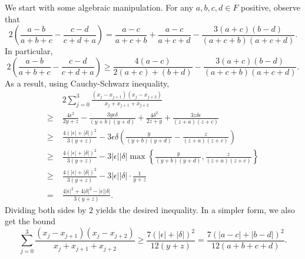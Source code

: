 \documentclass{article}
\begin{document}
We start with some algebraic manipulation.
For any $a, b, c, d \in F$ positive, observe that
\[ 2\left(\frac{a - b}{a + b + c} - \frac{c - d}{c + d + a}\right) = \frac{a - c}{a + c + b} + \frac{a - c}{a + c + d} - \frac{3(a + c)(b - d)}{(a + c + b)(a + c + d)}. \]
In particular,
\[ 2\left(\frac{a - b}{a + b + c} - \frac{c - d}{c + d + a}\right) \geq \frac{4(a - c)}{2(a + c) + (b + d)} - \frac{3(a + c)(b - d)}{(a + c + b)(a + c + d)}. \]
As a result, using Cauchy-Schwarz inequality,
\begin{align*}
    & 2 \sum_{j = 0}^3 \frac{(x_j - x_{j + 1})(x_j - x_{j + 2})}{x_j + x_{j + 1} + x_{j + 2}} \\
    \geq\;& \frac{4 \epsilon^2}{2y + z} - \frac{3y \epsilon \delta}{(y + b)(y + d)} + \frac{4 \delta^2}{2z + y} + \frac{3z \delta \epsilon}{(z + a)(z + c)} \\
    \geq\;& \frac{4(|\epsilon| + |\delta|)^2}{3(y + z)} - 3 \epsilon \delta \left(\frac{y}{(y + b)(y + d)} - \frac{z}{(z + a)(z + c)}\right) \\
    \geq\;& \frac{4(|\epsilon| + |\delta|)^2}{3(y + z)} - 3 |\epsilon| |\delta| \max\left\{\frac{y}{(y + b)(y + d)}, \frac{z}{(z + a)(z + c)}\right\} \\
    \geq\;& \frac{4(|\epsilon| + |\delta|)^2}{3(y + z)} - 3 |\epsilon| |\delta| \cdot \frac{1}{y + z} \\
    =\;& \frac{4|\epsilon|^2 + 4|\delta|^2 - |\epsilon||\delta|}{3 (y + z)}.
\end{align*}
Dividing both sides by $2$ yields the desired inequality.
In a simpler form, we also get the bound
\[ \sum_{j = 0}^3 \frac{(x_j - x_{j + 1})(x_j - x_{j + 2})}{x_j + x_{j + 1} + x_{j + 2}} \geq \frac{7(|\epsilon| + |\delta|)^2}{12(y + z)} = \frac{7(|a - c| + |b - d|)^2}{12(a + b + c + d)}. \]
\end{document}
